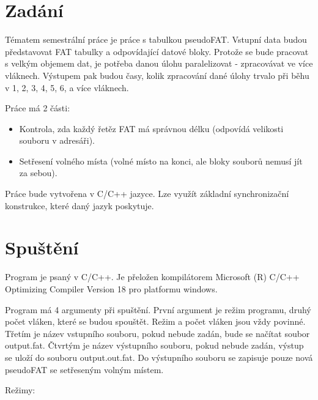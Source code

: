 \setlength{\parskip}{1em}

\chapter{Zadání}

Tématem semestrální práce je práce s tabulkou pseudoFAT. Vstupní data budou představovat FAT tabulky a odpovídající datové bloky. Protože se bude pracovat s velkým objemem dat, je potřeba  danou úlohu paralelizovat - zpracovávat ve více vláknech. Výstupem pak budou časy, kolik zpracování dané úlohy trvalo při běhu v 1, 2, 3, 4, 5, 6, a více vláknech.

Práce má 2 části:
\setlength{\parskip}{0em}
\begin{itemize}
	\item Kontrola, zda každý řetěz FAT má správnou délku (odpovídá velikosti souboru v adresáři).
	\item Setřesení volného místa (volné místo na konci, ale bloky souborů nemusí jít za sebou).
\end{itemize}
\setlength{\parskip}{1em}

Práce bude vytvořena v C/C++ jazyce. Lze využít základní synchronizační konstrukce, které daný jazyk poskytuje.


\chapter{Spuštění}

Program je psaný v C/C++. Je přeložen kompilátorem Microsoft (R) C/C++ Optimizing Compiler Version 18 pro platformu windows.

Program má 4 argumenty při spuštění. První argument je režim programu, druhý počet vláken, které se budou spouštět. Režim a počet vláken jsou vždy povinné. Třetím je název vstupního souboru, pokud nebude zadán, bude se načítat soubor output.fat. Čtvrtým je název výstupního souboru, pokud nebude zadán, výstup se uloží do souboru output.out.fat. Do výstupního souboru se zapisuje pouze nová pseudoFAT se setřeseným volným místem.

Režimy:
\setlength{\parskip}{0em}
\setlength{\parskip}{1em}

